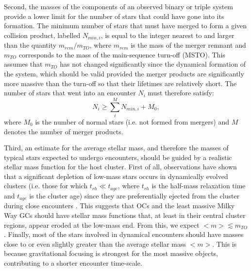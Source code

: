 \begin{enumerate}
Second, the masses of the components of an
observed binary or triple system provide a lower limit for the
number of stars that could have gone into its formation.  The minimum
number of 
stars that must have merged to form a given collision product, labelled
$N_{min,i}$, is equal to the integer nearest to and larger than the
quantity $m_{rem}/m_{TO}$, where $m_{rem}$ is the mass of the merger
remnant and $m_{TO}$ corresponds to the mass of the main-sequence
turn-off (MSTO).  This assumes that $m_{TO}$ has not changed
significantly since the dynamical formation of the system, which
should be valid provided the merger products are significantly more
massive than the turn-off so that their lifetimes are relatively
short.  The number of stars that went 
into an encounter $N_i$ must therefore satisfy:
\begin{equation}
\label{eqn:Nmerge}
N_i \ge \sum_i^M N_{min,i} + M_{0},
\end{equation}
where $M_{0}$ is the number of normal stars (i.e. not formed from
mergers) and $M$ denotes the number of merger products. 

Third, an estimate for the average stellar mass, and therefore the
masses of typical stars expected to undergo encounters, should be
guided by a realistic stellar mass function for 
the host cluster.  First of all, observations have shown that a
significant depletion of 
low-mass stars occurs in dynamically evolved clusters (i.e. those for
which $t_{rh} \ll t_{age}$, where $t_{rh}$ is the half-mass
relaxation time and $t_{age}$ is the cluster age) since they are
preferentially ejected from the cluster during close encounters
\citep[e.g.][]{vonhippel98, bonatto05, demarchi10}.  This suggests
that OCs and the least massive Milky Way GCs should 
have stellar mass functions that, at least in their central cluster
regions, appear eroded at the low-mass end.   From this, we expect
$<m> \lesssim m_{TO}$.  Finally, most of the stars
involved in dynamical encounters should have masses close to or even
slightly greater than the average stellar mass $<m>$.  This is because
gravitational focusing is strongest for the most massive objects,
contributing to a shorter encounter time-scale. 


\end{enumerate}
